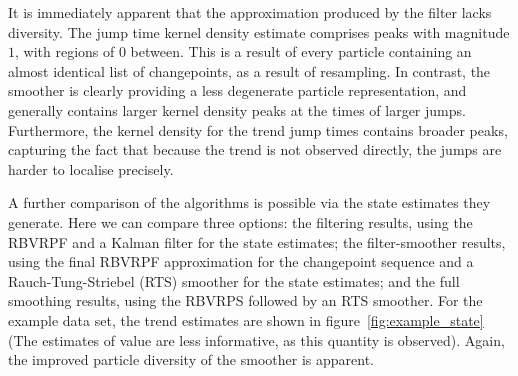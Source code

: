 \documentclass[journal]{IEEEtran}
\begin{document}
It is immediately apparent that the approximation produced by the filter lacks diversity. The jump time kernel density estimate comprises peaks with magnitude $1$, with regions of $0$ between. This is a result of every particle containing an almost identical list of changepoints, as a result of resampling. In contrast, the smoother is clearly providing a less degenerate particle representation, and generally contains larger kernel density peaks at the times of larger jumps. Furthermore, the kernel density for the trend jump times contains broader peaks, capturing the fact that because the trend is not observed directly, the jumps are harder to localise precisely.


A further comparison of the algorithms is possible via the state estimates they generate. Here we can compare three options: the filtering results, using the RBVRPF and a Kalman filter for the state estimates; the filter-smoother results, using the final RBVRPF approximation for the changepoint sequence and a Rauch-Tung-Striebel (RTS) smoother for the state estimates; and the full smoothing results, using the RBVRPS followed by an RTS smoother. For the example data set, the trend estimates are shown in figure~\ref{fig:example_state} (The estimates of value are less informative, as this quantity is observed). Again, the improved particle diversity of the smoother is apparent.
\end{document}
